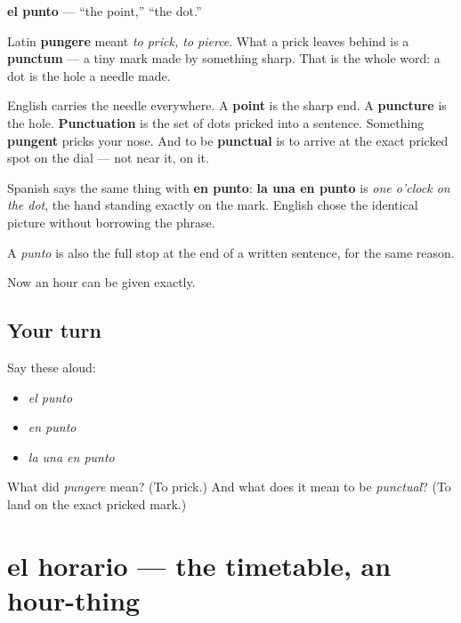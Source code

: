 \begin{cousinweb}
\textbf{el punto} — \textquotedblleft{}the point,\textquotedblright{} \textquotedblleft{}the dot.\textquotedblright{}

Latin \textbf{pungere} meant \emph{to prick, to pierce}. What a prick leaves behind is a \textbf{punctum} — a tiny mark made by something sharp. That is the whole word: a dot is the hole a needle made.

English carries the needle everywhere. A \textbf{point} is the sharp end. A \textbf{puncture} is the hole. \textbf{Punctuation} is the set of dots pricked into a sentence. Something \textbf{pungent} pricks your nose. And to be \textbf{punctual} is to arrive at the exact pricked spot on the dial — not near it, on it.

Spanish says the same thing with \textbf{en punto}: \textbf{la una en punto} is \emph{one o'clock on the dot}, the hand standing exactly on the mark. English chose the identical picture without borrowing the phrase.

A \emph{punto} is also the full stop at the end of a written sentence, for the same reason.
\end{cousinweb}

\begin{grammarlens}[title={What you've built}]
Now an hour can be given exactly.
\end{grammarlens}

\subsection*{Your turn}
Say these aloud:

\begin{itemize}
\raggedright
  \item \emph{el punto}
  \item \emph{en punto}
  \item \emph{la una en punto}
\end{itemize}

\begin{tcolorbox}[breakable,colback=teal!4,colframe=teal!35!black,title={Before you move on}]
What did \emph{pungere} mean? (To prick.) And what does it mean to be \emph{punctual}? (To land on the exact pricked mark.)
\end{tcolorbox}
\section[el horario]{el horario — the timetable, an hour-thing}

